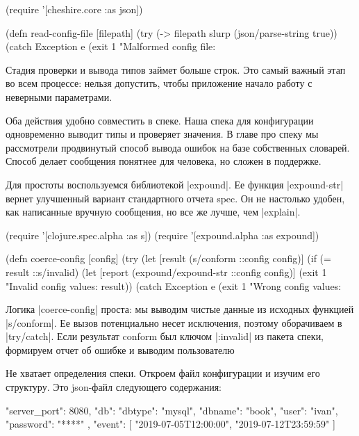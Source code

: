 \begin{code}
(require '[cheshire.core :as json])

(defn read-config-file
  [filepath]
  (try
    (-> filepath slurp (json/parse-string true))
    (catch Exception e
      (exit 1 "Malformed config file: %
\end{code}

Стадия проверки и вывода типов займет больше строк. Это самый важный этап во
всем процессе: нельзя допустить, чтобы приложение начало работу с неверными
параметрами.

Оба действия удобно совместить в спеке. Наша спека для конфигурации одновременно
выводит типы и проверяет значения. В главе про спеку мы рассмотрели продвинутый
способ вывода ошибок на базе собственных словарей. Способ делает сообщения
понятнее для человека, но сложен в поддержке.

Для простоты воспользуемся библиотекой \spverb|expound|. Ее функция \spverb|expound-str|
вернет улучшенный вариант стандартного отчета spec. Он не настолько удобен, как
написанные вручную сообщения, но все же лучше, чем \spverb|explain|.

\begin{code}
(require '[clojure.spec.alpha :as s])
(require '[expound.alpha :as expound])

(defn coerce-config
  [config]
  (try
    (let [result (s/conform ::config config)]
      (if (= result ::s/invalid)
        (let [report (expound/expound-str ::config config)]
          (exit 1 "Invalid config values: %
        result))
    (catch Exception e
      (exit 1 "Wrong config values: %
\end{code}

Логика \spverb|coerce-config| проста: мы выводим чистые данные из исходных функцией
\spverb|s/conform|. Ее вызов потенциально несет исключения, поэтому оборачиваем в
\spverb|try/catch|. Если результат conform был ключом \spverb|:invalid| из пакета спеки,
формируем отчет об ошибке и выводим пользователю

Не хватает определения спеки. Откроем файл конфигурации и изучим его
структуру. Это json-файл следующего содержания:

\begin{code}
{
    "server_port": 8080,
    "db": {
        "dbtype":   "mysql",
        "dbname":   "book",
        "user":     "ivan",
        "password": "****"
    },
    "event": [
        "2019-07-05T12:00:00",
        "2019-07-12T23:59:59"
    ]
}
\end{code}


